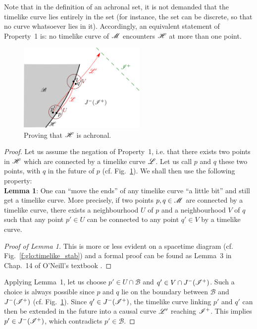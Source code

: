Note that in the definition of an achronal set, it is not demanded that the timelike
curve lies entirely in the set (for instance, the set can be discrete, so that no curve
whatsoever lies in it). Accordingly,
an equivalent statement of Property~1 is: no timelike curve of $\mathscr{M}$
encounters $\mathscr{H}$ at more than one point.

\begin{figure}
\centerline{\includegraphics[width=0.55\textwidth]{glo_achronal.pdf}}
\caption[]{\label{f:glo:achronal} \footnotesize
Proving that $\mathscr{H}$ is achronal.}
\end{figure}

\begin{proof}
Let us assume the negation of Property~1, i.e. that there exists two points
in $\mathscr{H}$ which are connected by a timelike curve $\mathscr{L}$. Let us call $p$ and
$q$ these two points, with $q$ in the future of $p$ (cf. Fig.~\ref{f:glo:achronal}).
We shall then use the following property:\\[1ex]
\textbf{Lemma 1}: One can ``move the ends'' of any timelike curve
``a little bit'' and still get a timelike curve. More precisely,
if two points $p,q\in\mathscr{M}$ are connected by a timelike curve,
there exists
a neighbourhood $U$ of $p$ and a neighbourhood $V$ of $q$ such that
any point $p'\in U$ can be connected to any point $q'\in V$ by a timelike curve.
\begin{proof}[Proof of Lemma 1]
This is more or less evident on a spacetime diagram (cf. Fig.~\ref{f:glo:timelike_stab})
and a formal proof
can be found as Lemma~3
in Chap.~14 of O'Neill's textbook \cite{ONeil83}.
\end{proof}
Applying Lemma~1,
let us choose $p'\in U\cap\mathscr{B}$ and $q'\in V\cap J^-(\mathscr{I}^+)$. Such a choice is
always possible since $p$ and $q$ lie on the boundary between $\mathscr{B}$
and $J^-(\mathscr{I}^+)$ (cf. Fig.~\ref{f:glo:achronal}).
Since $q'\in J^-(\mathscr{I}^+)$, the timelike curve linking $p'$ and $q'$ can then be extended in the future into a causal curve $\mathscr{L}'$ reaching $\mathscr{I}^+$. This implies $p'\in J^-(\mathscr{I}^+)$,
which contradicts $p'\in\mathscr{B}$.
\end{proof}


